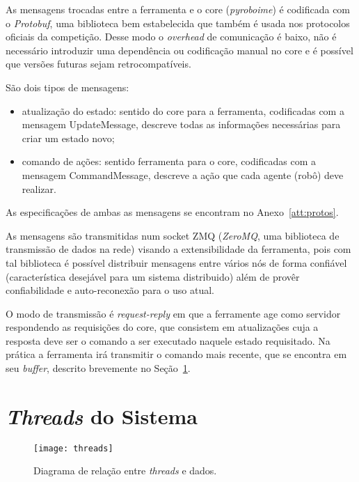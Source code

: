 As mensagens trocadas entre a ferramenta e o core (\textit{pyroboime}) é
codificada com o \textit{Protobuf}, uma biblioteca bem estabelecida que também é
usada nos protocolos oficiais da competição.  Desse modo o \textit{overhead} de
comunicação é baixo, não é necessário introduzir uma dependência ou codificação
manual no core e é possível que versões futuras sejam retrocompatíveis.
\nocite{protobufdocs}

São dois tipos de mensagens:

\begin{itemize}
  \item atualização do estado: sentido do core para a ferramenta, codificadas
    com a mensagem UpdateMessage, descreve todas as informações necessárias para
    criar um estado novo;
  \item comando de ações: sentido ferramenta para o core, codificadas com a
    mensagem CommandMessage, descreve a ação que cada agente (robô) deve
    realizar.
\end{itemize}

As especificações de ambas as mensagens se encontram no Anexo~\ref{att:protos}.

As mensagens são transmitidas num socket ZMQ (\textit{ZeroMQ}, uma biblioteca de
transmissão de dados na rede) visando a extensibilidade da ferramenta, pois com
tal biblioteca é possível distribuir mensagens entre vários nós de forma
confiável (característica desejável para um sistema distribuido) além de provêr
confiabilidade e auto-reconexão para o uso atual. \nocite{zmqdocs}

O modo de transmissão é \textit{request-reply} em que a ferramente age como
servidor respondendo as requisições do core, que consistem em atualizações cuja
a resposta deve ser o comando a ser executado naquele estado requisitado.  Na
prática a ferramenta irá transmitir o comando mais recente, que se encontra em
seu \textit{buffer}, descrito brevemente no Seção~\ref{sec:threads}.

\section{\textit{Threads} do Sistema}\label{sec:threads}

\begin{figure}[H]
  \centering
  \texttt{[image: threads]}
  \caption{Diagrama de relação entre \textit{threads} e
  dados.}\label{fig:arch_threads}
\end{figure}


